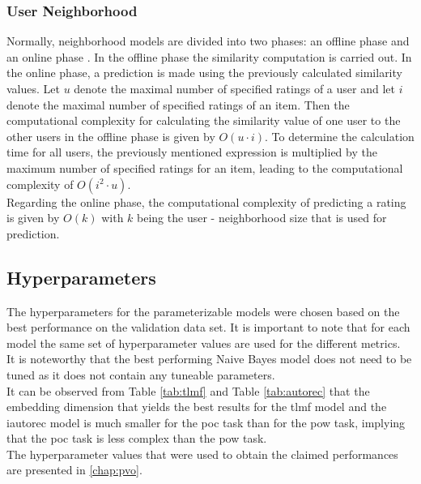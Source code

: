 \subsubsection{User Neighborhood}
Normally, neighborhood models are divided into two phases: an offline phase and an online phase \cite{aggarwal2016recommender}. In the offline phase the similarity computation is carried out. In the online phase, a prediction is made using the previously calculated similarity values.
Let $u$ denote the maximal number of specified ratings of a user and let $i$ denote the maximal number of specified ratings of an item. Then the computational complexity for calculating the similarity value of one user to the other users in the offline phase is given by $O(u \cdot i)$. 
To determine the calculation time for all users, the previously mentioned expression is multiplied by the maximum number of specified ratings for an item, leading to the computational complexity of $O(i^2 \cdot u)$.\\
Regarding the online phase, the computational complexity of predicting a rating is given by $O(k)$ with $k$ being the user - neighborhood size that is used for prediction.
\subsection{Hyperparameters}
\label{chap:hyperparams}
The hyperparameters for the parameterizable models were chosen based on the best performance on the validation data set. It is important to note that for each model the same set of hyperparameter values are used for the different metrics.\\
It is noteworthy that the best performing Naive Bayes model does not need to be tuned as it does not contain any tuneable parameters.\\
It can be observed from Table \ref{tab:tlmf} and Table \ref{tab:autorec} that the embedding dimension that yields the best results for the \acrshort{tlmf} model and the \acrshort{iautorec} model is much smaller for the \acrshort{poc} task than for the \acrshort{pow} task, implying that the \acrshort{poc} task is less complex than the \acrshort{pow} task.\\ 
The hyperparameter values that were used to obtain the claimed performances are presented in \ref{chap:pvo}.

